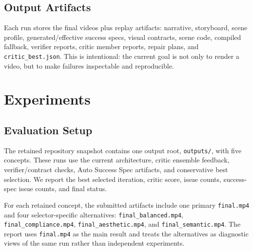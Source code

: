 \documentclass[10pt,letterpaper]{article}
\begin{document}
\subsection{Output Artifacts}

Each run stores the final videos plus replay artifacts: narrative,
storyboard, scene profile, generated/effective success specs, visual
contracts, scene code, compiled fallback, verifier reports, critic member
reports, repair plans, and \texttt{critic\_best.json}. This is intentional:
the current goal is not only to render a video, but to make failures
inspectable and reproducible.

\section{Experiments}
\label{sec:experiments}

\subsection{Evaluation Setup}

The retained repository snapshot contains one output root, \texttt{outputs/},
with five concepts. These runs use the current architecture, critic ensemble
feedback, verifier/contract checks, Auto Success Spec artifacts, and
conservative best selection. We report the best selected iteration, critic
score, issue counts, success-spec issue counts, and final status.

For each retained concept, the submitted artifacts include one primary
\texttt{final.mp4} and four selector-specific alternatives:
\texttt{final\_balanced.mp4}, \texttt{final\_compliance.mp4},
\texttt{final\_aesthetic.mp4}, and \texttt{final\_semantic.mp4}. The report
uses \texttt{final.mp4} as the main result and treats the alternatives as
diagnostic views of the same run rather than independent experiments.
\end{document}
